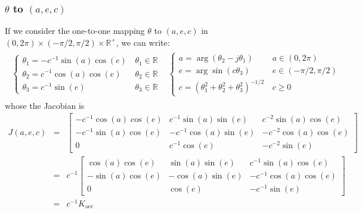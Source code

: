 \documentclass[a4paper, 12pt]{report}
\def\aec{\mathrm{aec}}
\begin{document}
\subsubsection{$\theta$ to $(a,e,c)$ }
If we consider the one-to-one mapping $\theta$ to $(a,e,c)$ in $(0,2\pi)\times(-\pi/2,\pi/2)\times\mathds{R}^+$, we can write:
\begin{eqnarray*}
\begin{array}{cc}
 \left\{
 \begin{array}{ll}
 \theta_{1}=-c^{-1} \sin(a)\cos(e)&\, \theta_{1}\in\mathds{R}
 \\
 \theta_{2}=c^{-1}  \cos(a)\cos(e)&\,\theta_{2}\in\mathds{R}
 \\
 \theta_{3}=c^{-1}\sin(e)&\, \theta_{3}\in\mathds{R}
 \end{array}\right.
&
 \left\{
 \begin{array}{ll}
 a=\arg(\theta_{2}-j \theta_{1})& \, a\in(0,2\pi)
  \\
e=\arg\sin(c\theta_{3})& \,e\in(-\pi/2,\pi/2)
 \\
 c=(\theta_{1}^{2}+ \theta_{2}^{2}+ \theta_{3}^{2})^{-1/2}& \, c \geq 0
 \end{array}\right.
\end{array}
\end{eqnarray*}
whose the Jacobian is
\begin{eqnarray}
 \label{eq:jacobianaec2theta}
 J(a,e,c)
&= &
 \begin{bmatrix}
-c^{-1}\cos(a)\cos(e)&c^{-1}\sin(a)\sin(e)&c^{-2}\sin(a)\cos(e)
\\
-c^{-1}\sin(a)\cos(e)&-c^{-1}\cos(a)\sin(e)&-c^{-2}\cos(a)\cos(e)
\\
0&c^{-1}\cos(e)&-c^{-2}\sin(e)
\end{bmatrix}
\\
&=&\nonumber
c^{-1}
\begin{bmatrix}
\cos(a)\cos(e)&\sin(a)\sin(e)&c^{-1}\sin(a)\cos(e)
\\
-\sin(a)\cos(e)&-\cos(a)\sin(e)&-c^{-1}\cos(a)\cos(e)
\\
0&\cos(e)&-c^{-1}\sin(e)
\end{bmatrix}
\\
&=&\nonumber
c^{-1}K_{\aec}
\end{eqnarray}
\end{document}
